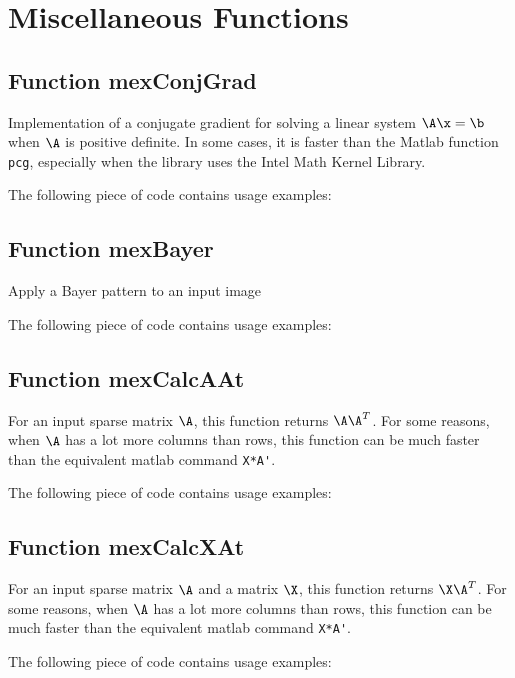 \documentclass[a4paper, 11pt]{article}
\begin{document}
\section{Miscellaneous Functions}

\subsection{Function mexConjGrad}

Implementation of a conjugate gradient for solving a linear system $\A\x=\b$
when $\A$ is positive definite. In some cases, it is faster than the Matlab
function \verb|pcg|, especially when the library uses the Intel Math Kernel Library.
%    

The following piece of code contains usage examples:


\subsection{Function mexBayer}

Apply a Bayer pattern to an input image
%    

The following piece of code contains usage examples:



\subsection{Function mexCalcAAt}

For an input sparse matrix $\A$, this function returns $\A\A^T$. For some reasons, when $\A$ has a lot more columns than rows, this function can be much faster than the equivalent matlab command \verb|X*A'|. 
%    

The following piece of code contains usage examples:



\subsection{Function mexCalcXAt}
For an input sparse matrix $\A$ and a matrix $\X$, this function returns $\X\A^T$. For some reasons, when $\A$ has a lot more columns than rows, this function can be much faster than the equivalent matlab command \verb|X*A'|. 
%    

The following piece of code contains usage examples:

\end{document}
